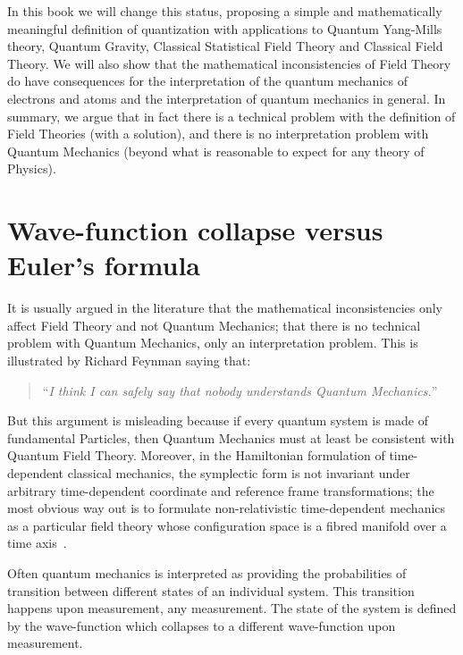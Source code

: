 \documentclass[11pt]{book}
\begin{document}
In this book we will change this status, proposing a simple and
mathematically meaningful definition of quantization with applications
to Quantum Yang-Mills theory, Quantum Gravity, Classical Statistical
Field Theory and Classical Field Theory. We will also show that the
mathematical inconsistencies of Field Theory do have consequences for
the interpretation of the quantum mechanics of electrons and atoms and
the interpretation of quantum mechanics in general. In summary, we argue
that in fact there is a technical problem with the definition of Field
Theories (with a solution), and there is no interpretation problem with
Quantum Mechanics (beyond what is reasonable to expect for any theory of
Physics).

\hypertarget{wave-function-collapse-versus-eulers-formula}{%
\section{Wave-function collapse versus Euler's
formula}\label{wave-function-collapse-versus-eulers-formula}}

It is usually argued in the literature that the mathematical
inconsistencies only affect Field Theory and not Quantum Mechanics; that
there is no technical problem with Quantum Mechanics, only an
interpretation problem. This is illustrated by Richard Feynman saying
that:

\begin{quote}
``\emph{I think I can safely say that nobody understands Quantum
Mechanics.}''
\end{quote}

But this argument is misleading because if every quantum system is made
of fundamental Particles, then Quantum Mechanics must at least be
consistent with Quantum Field Theory. Moreover, in the Hamiltonian
formulation of time-dependent classical mechanics, the symplectic form
is not invariant under arbitrary time-dependent coordinate and reference
frame transformations; the most obvious way out is to formulate
non-relativistic time-dependent mechanics as a particular field theory
whose configuration space is a fibred manifold over a time
axis~\cite{Giachetta2010Geometric}\cite{Mangiarotti1998Gauge}.

Often quantum mechanics is interpreted as providing the probabilities of
transition between different states of an individual system. This
transition happens upon measurement, any measurement. The state of the
system is defined by the wave-function which collapses to a different
wave-function upon measurement.
\end{document}
